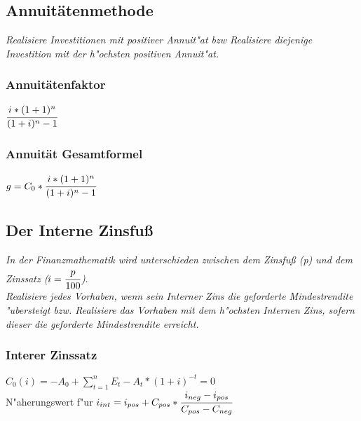 \documentclass[a4paper,12pt]{scrartcl}
\begin{document}
\subsection{Annuitätenmethode}
\textit{Realisiere Investitionen mit positiver Annuit"at bzw Realisiere diejenige Investition mit der h"ochsten positiven Annuit"at.}
\subsubsection{Annuitätenfaktor}
$\cfrac{i * (1+1)^n}{(1+i)^n -1}$
\subsubsection{Annuität Gesamtformel}
$ g = C_0 * \cfrac{i * (1+1)^n}{(1+i)^n -1}$

\subsection{Der Interne Zinsfuß}
\textit{In der Finanzmathematik wird unterschieden zwischen dem Zinsfuß (p) und dem Zinssatz ($i=\cfrac{p}{100}$)}. \\
\textit{Realisiere jedes Vorhaben, wenn sein Interner Zins die geforderte Mindestrendite "ubersteigt bzw. Realisiere das Vorhaben mit dem h"ochsten Internen Zins, sofern dieser die geforderte Mindestrendite erreicht.}

\subsubsection{Interer Zinssatz}
$C_0(i) = -A_0 + \displaystyle\sum_{t=1}^{n} E_t - A_t * (1+i)^{-t} = 0$
\\
N"aherungswert f"ur $i_{int} = i_{pos} + C_{pos} * \cfrac{i_{neg} - i_{pos}}{C_{pos} - C_{neg}}$
\end{document}
